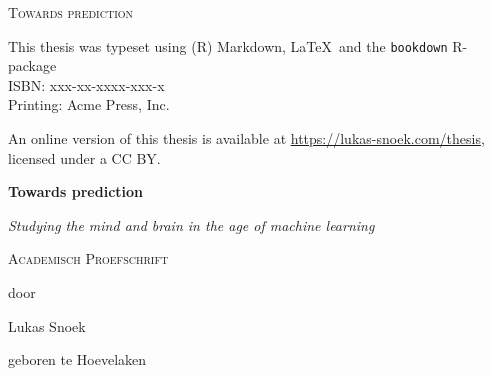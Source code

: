 \documentclass[11pt,american,]{memoir} %
\newcommand{\CoverName}{cover} %
\begin{document}

\setlength{\abstitleskip}{-\absparindent}

\pagestyle{empty}
\renewcommand{\thepage}{\CoverName} %


\frontmatter
\thispagestyle{empty}
\def\drop{.1\textheight}

\vspace*{\drop}
\begin{center}
\Huge \textsc{Towards prediction}
\end{center}

\clearpage
\thispagestyle{empty}
\vspace*{\fill}
\begingroup %
\small
\setlength{\parskip}{\baselineskip} %
\setlength\parindent{0pt} %

This thesis was typeset using (R) Markdown, \LaTeX\ and the \verb+bookdown+ R-package
\\ ISBN: xxx-xx-xxxx-xxx-x\\ Printing: Acme Press, Inc.

An online version of this thesis is available at \url{https://lukas-snoek.com/thesis}, licensed under a CC BY.
\endgroup

\clearpage
\thispagestyle{empty}
\vspace*{\drop}
\begin{center}
\Huge\textbf{Towards prediction}\par
\vspace{\baselineskip}
\Large\textit{Studying the mind and brain in the age of machine learning}\par
\vfill %
\large \textsc{Academisch Proefschrift}\par
\vspace{\baselineskip}
\par %
\vspace{\baselineskip}
{\large door}\par
\vspace{\baselineskip}
{\Large Lukas Snoek}\par
\vspace{\baselineskip}
{\large geboren te Hoevelaken}
\end{center}
\end{document}
